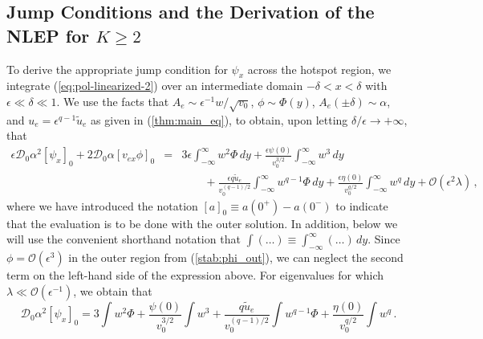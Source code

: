 \documentclass{article}%
\begin{document}
\subsection{Jump Conditions and the Derivation of the NLEP for $K\geq 2$}

To derive the appropriate jump condition for $\psi_x$ across the
hotspot region, we integrate (\ref{eq:pol-linearized-2}) over an
intermediate domain $-\delta<x<\delta$ with $\epsilon\ll \delta\ll
1$. We use the facts that $A_{e}\sim \epsilon^{-1} {w/\sqrt{v_{0}}}$,
$\phi\sim\Phi(y)$, $A_{e}(\pm\delta)\sim\alpha$, and
$u_{e}=\epsilon^{q-1}\tilde{u}_e$ as given in (\ref{thm:main_eq}), to
obtain, upon letting ${\delta/\epsilon}\to +\infty$, that
\begin{eqnarray*}
\epsilon {\mathcal D}_{0}\alpha^{2}\left[\psi_{x}\right]_{0}+
2{\mathcal D}_{0}\alpha\left[v_{ex}\phi\right]_{0} & = & 
3\epsilon\int_{-\infty}^{\infty}w^{2}\Phi \, dy+
\frac{\epsilon\psi(0)}{v_{0}^{3/2}}\int_{-\infty}^{\infty}w^{3} \, dy\\
 &  & \qquad +\frac{\epsilon q\tilde{u}_{e}}{v_{0}^{(q-1)/2}}
\int_{-\infty}^{\infty}w^{q-1}\Phi \, dy+\frac{\epsilon\eta(0)}{v_{0}^{q/2}}
\int_{-\infty}^{\infty}w^{q} \, dy+{\mathcal O}(\epsilon^{2}\lambda)\,,
\end{eqnarray*}
where we have introduced the notation $[a]_{0}\equiv
a(0^{+})-a(0^{-})$ to indicate that the evaluation is to be done with
the outer solution. In addition, below we will use the convenient
shorthand notation that
$\int\left(\dots\right)\equiv\int_{-\infty}^{\infty}\left(\dots\right)\,
dy$.  Since $\phi={\mathcal O}(\epsilon^{3})$ in the outer region from
(\ref{stab:phi_out}), we can neglect the second term on the left-hand
side of the expression above.  For eigenvalues for which $\lambda\ll
{\mathcal O}(\epsilon^{-1})$, we obtain that
\begin{equation}
{\mathcal D}_{0}\alpha^{2}[\psi_{x}]_{0}=3\int
w^{2}\Phi+\frac{\psi(0)}{v_{0}^{3/2}}\int
w^{3}+\frac{q\tilde{u}_{e}}{v_{0}^{(q-1)/2}}\int
w^{q-1}\Phi+\frac{\eta(0)}{v_{0}^{q/2}}\int w^{q} \,. \label{eq:pol-psi-1}
\end{equation}
\end{document}
